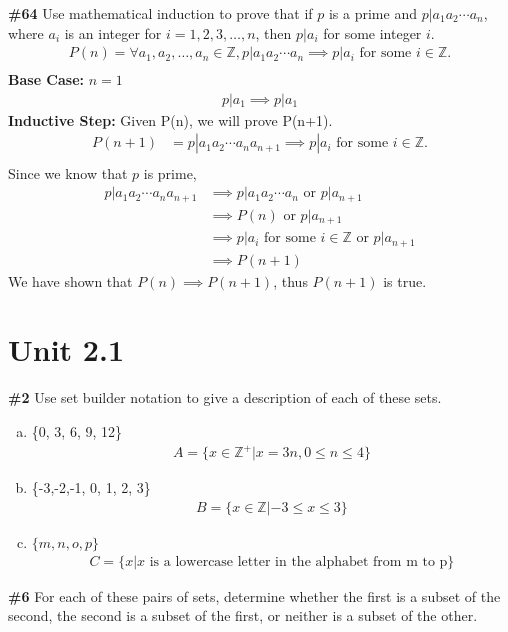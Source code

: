\documentclass{article}
\newcommand{\unit}[1]{\section{Unit #1}}
\newcommand{\problem}[1]{\textbf{\##1}}
\newcommand{\prob}[1]{\problem{#1}}
\newcommand{\AllIntegers}{\mathbb{Z}}
\begin{document}
\pagebreak
\prob{64}
Use mathematical induction to prove that if \(p\) is a prime and \(p | a_1a_2 \cdots a_n\), where \(a_i\) is an integer for \(i = 1, 2, 3, \dots , n\), then \(p | a_i\) for some integer \(i\). 
\begin{align*}
    P(n) = \forall a_1, a_2, \dots, a_n \in \AllIntegers, p | a_1a_2 \cdots a_n \implies p | a_i \text{ for some } i \in \AllIntegers .\\
\end{align*}
\textbf{Base Case:} \(n=1\)
\begin{align*}
    p | a_1 \implies p | a_1
\end{align*}
\textbf{Inductive Step:} Given P(n), we will prove P(n+1).
\begin{align*}
    P(n+1) &= p|a_1a_2\cdots a_na_{n+1} \implies p|a_i \text{ for some } i \in \AllIntegers .\\
\end{align*}
Since we know that \(p\) is prime,
\begin{align*}
    p|a_1a_2\cdots a_na_{n+1} &\implies p|a_1a_2\cdots a_n \text{ or } p|a_{n+1}\\
    &\implies P(n) \text{ or } p|a_{n+1}\\
    &\implies p|a_i \text{ for some } i \in \AllIntegers \text{ or } p|a_{n+1}\\
    &\implies P(n+1)
\end{align*}
We have shown that \(P(n) \implies P(n+1)\), thus \(P(n+1)\) is true.
\pagebreak
\unit{2.1} 
\prob{2} Use set builder notation to give a description of each of these sets.
\begin{enumerate}[a)]
    \item \{{0, 3, 6, 9, 12}\}\\
    \begin{align*}
        A = \{x \in \AllIntegers^+ | x = 3n, 0 \leq n \leq 4\}
    \end{align*}
    \item \{{-3,-2,-1, 0, 1, 2, 3}\}
    \begin{align*}
        B = \{x \in \AllIntegers | -3 \leq x \leq 3\}
    \end{align*}
    \item \(\{m,n,o,p\}\)
    \begin{align*}
        C = \{x | x \text{ is a lowercase letter in the alphabet from m to p}\}
    \end{align*}
\end{enumerate}
\pagebreak
\prob{6} For each of these pairs of sets, determine whether the first is a subset of the second, the second is a subset of the first, or neither is a subset of the other.
\end{document}
